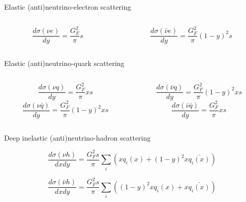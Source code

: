 \begin{frame}{Elastic (anti)neutrino-electron scattering}

\begin{columns}[T]
  \begin{column}{0.50\textwidth}
    \begin{equation*}
       \frac{d\sigma({\nu}e)}{dy} = \frac{G_{F}^{2}}{\pi} s
    \end{equation*}
  \end{column}
  \begin{column}{0.50\textwidth}
    \begin{equation*}
       \frac{d\sigma(\bar{\nu}e)}{dy} = \frac{G_{F}^{2}}{\pi} (1-y)^{2} s
    \end{equation*}
  \end{column}
\end{columns}

\end{frame}



\begin{frame}{Elastic (anti)neutrino-quark scattering}

\begin{columns}[T]
  \begin{column}{0.50\textwidth}
    \begin{equation*}
       \frac{d\sigma({\nu}q)}{dy} = \frac{G_{F}^{2}}{\pi} x s
    \end{equation*}
    \begin{equation*}
       \frac{d\sigma({\nu}\bar{q})}{dy} = \frac{G_{F}^{2}}{\pi} (1-y)^{2} x s
    \end{equation*}
  \end{column}
  \begin{column}{0.50\textwidth}
    \begin{equation*}
       \frac{d\sigma(\bar{\nu}q)}{dy} = \frac{G_{F}^{2}}{\pi} (1-y)^{2} x s
    \end{equation*}
    \begin{equation*}
       \frac{d\sigma(\bar{\nu}\bar{q})}{dy} = \frac{G_{F}^{2}}{\pi} x s
    \end{equation*}
  \end{column}
\end{columns}

\end{frame}



\begin{frame}{Deep inelastic (anti)neutrino-hadron scattering}

 \begin{equation*}
    \frac{d\sigma({\nu}h)}{dxdy} = \frac{G_{F}^{2}s}{\pi} \sum_{i} (xq_{i}(x) + (1-y)^{2} x\bar{q_{i}(x)})
 \end{equation*}

 \begin{equation*}
    \frac{d\sigma(\bar{\nu}h)}{dxdy} = \frac{G_{F}^{2}s}{\pi} \sum_{i} ((1-y)^{2} xq_{i}(x) + x\bar{q_{i}(x)})
 \end{equation*}

\end{frame}



